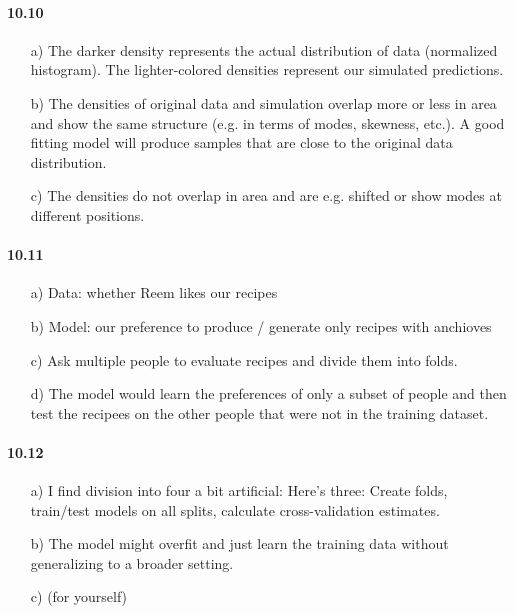 \documentclass[fontsize=11pt,DIV=18,parskip=half]{scrartcl}
\begin{document}
\paragraph{10.10}

\begin{itemize}
\item[a)] The darker density represents the actual distribution of data (normalized histogram). The lighter-colored densities represent our simulated predictions.
\item[b)] The densities of original data and simulation overlap more or less in area and show the same structure (e.g. in terms of modes, skewness, etc.). A good fitting model will produce samples that are close to the original data distribution.
\item[c)] The densities do not overlap in area and are e.g. shifted or show modes at different positions.
\end{itemize}

\paragraph{10.11}

\begin{itemize}
\item[a)] Data: whether Reem likes our recipes
\item[b)] Model: our preference to produce / generate only recipes with anchioves
\item[c)] Ask multiple people to evaluate recipes and divide them into folds.
\item[d)] The model would learn the preferences of only a subset of people and then test the recipees on the other people that were not in the training dataset.
\end{itemize}

\paragraph{10.12}
\begin{itemize}
\item[a)] I find division into four a bit artificial: Here's three: Create folds, train/test models on all splits, calculate cross-validation estimates.
\item[b)] The model might overfit and just learn the training data without generalizing to a broader setting.
\item[c)] (for yourself)
\end{itemize}
\end{document}
